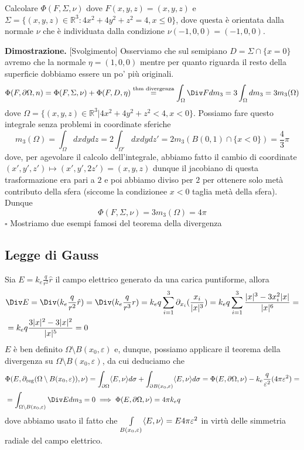 %
\vspace{0.5cm}
\begin{example}[\textcolor{blue}{calcolo del flusso tramite il teorema della divergenza}]
	Calcolare $\Phi(F, \Sigma, \nu)$ dove $F(x, y, z)=(x, y, z)$ e $\Sigma=\{(x, y, z) \in \mathbb{R}^3 : 4x^2 + 4y^2 + z^2 = 4, x \leq 0 \}$, dove questa è orientata dalla normale $\nu$ che è individuata dalla condizione
	$\nu(-1, 0, 0) = (-1, 0, 0)$.
\end{example}
%
\noindent \textbf{Dimostrazione. } [Svolgimento]
	Osserviamo che sul semipiano $D = \Sigma \cap \{x = 0\}$ avremo che la normale $\eta = (1, 0, 0)$ mentre per quanto riguarda il resto della superficie dobbiamo essere un po' più originali.
	$$
	\Phi(F, \partial \Omega, n) = \Phi(F, \Sigma, \nu) + \Phi(F, D, \eta) \stackrel{\text{thm divergenza}}{=} \int_\Omega \Div F dm_3 = 3\int_\Omega dm_3 = 3m_3(\Omega) 
	$$
	dove $\Omega = \{(x, y, z) \in \mathbb{R}^3 | 4x^2 + 4y^2 + z^2 < 4, x < 0 \}$. Possiamo fare questo integrale senza problemi in coordinate sferiche
	$$
	m_3(\Omega) = \int_\Omega dxdydz = 2 \int_{\Omega'} dxdydz' = 2 m_3(B(0, 1) \cap \{ x < 0 \})= \frac{4}{3} \pi 
	$$
	dove, per agevolare il calcolo dell'integrale, abbiamo fatto il cambio di coordinate $(x', y', z') \mapsto (x', y', 2z') = (x, y, z)$ dunque il jacobiano di questa trasformazione era pari a $2$ e poi abbiamo diviso per $2$ per ottenere solo metà contributo della sfera (siccome la condizionee $x<0$ taglia metà della sfera).
	Dunque
	$$
	\Phi(F, \Sigma, \nu) = 3m_3(\Omega) = 4\pi
	$$
\hfill $\square$
%
Mostriamo due esempi famosi del teorema della divergenza
%
\vspace{0.5cm}
\subsection{Legge di Gauss}
Sia $E = k_e \frac{q}{r^2}\hat{r}$ il campo elettrico generato da una carica puntiforme, allora
%
\[\begin{aligned}
&\Div E = \Div(k_e \frac{q}{r^2} \hat{r}) = \Div(k_e \frac{q}{r^3}r) = k_e q \sum_{i=1}^3 \partial_{x_i} (\frac{x_i}{|x|^3}) = k_e q \sum_{i=1}^3 \frac{|x|^3 - 3 x_i^2 |x|}{|x|^6} = \\
&=k_e q \frac{3|x|^2 - 3 |x|^2}{|x|^5} = 0
\end{aligned}\]
%
$E$ è ben definito $\Omega \setminus B(x_0, \varepsilon)$ e, dunque, possiamo applicare il teorema della divergenza su $\Omega \setminus B(x_0, \varepsilon)$, da cui deduciamo che
%
\[\begin{aligned}
&\Phi(E, \partial_{\text{reg}} (\Omega \setminus B(x_0, \varepsilon)), \nu) = \int_{\partial \Omega} \innerprod{E}{\nu} d\sigma + \int_{\partial B(x_0, \varepsilon)} \innerprod{E}{\nu} d\sigma = \Phi(E, \partial \Omega, \nu) - k_e \frac{q}{\varepsilon^2} (4 \pi \varepsilon^2) = \\
&=\int_{\Omega \setminus B(x_0, \varepsilon)} \Div E dm_3 = 0 \implies \Phi(E, \partial \Omega, \nu) = 4 \pi k_e q
\end{aligned}\]
%
dove abbiamo usato il fatto che $\int\limits_{B(x_0, \varepsilon)} \langle E, \nu \rangle = E 4 \pi \varepsilon^2$ in virtù delle simmetria radiale del campo elettrico.
%
\vspace{0.5cm}
